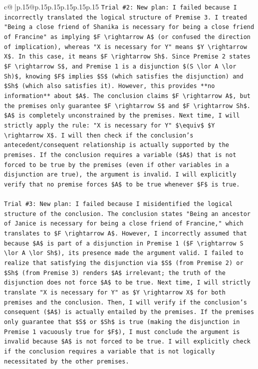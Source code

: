 \documentclass{article}
\begin{document}
{\begin{supertabular}{c@{$\;$}|p{.15\linewidth}@{}p{.15\linewidth}p{.15\linewidth}p{.15\linewidth}p{.15\linewidth}p{.15\linewidth}}
{{{\texttt{Trial \#2: New plan: I failed because I incorrectly translated the logical structure of Premise 3. I treated "Being a close friend of Shanika is necessary for being a close friend of Francine" as implying \$F \textbackslash{}rightarrow A\$ (or confused the direction of implication), whereas "X is necessary for Y" means \$Y \textbackslash{}rightarrow X\$. In this case, it means \$F \textbackslash{}rightarrow Sh\$. Since Premise 2 states \$F \textbackslash{}rightarrow S\$, and Premise 1 is a disjunction \$(S \textbackslash{}lor A \textbackslash{}lor Sh)\$, knowing \$F\$ implies \$S\$ (which satisfies the disjunction) and \$Sh\$ (which also satisfies it). However, this provides **no information** about \$A\$. The conclusion claims \$F \textbackslash{}rightarrow A\$, but the premises only guarantee \$F \textbackslash{}rightarrow S\$ and \$F \textbackslash{}rightarrow Sh\$. \$A\$ is completely unconstrained by the premises. Next time, I will strictly apply the rule: "X is necessary for Y" \$\textbackslash{}equiv\$ \$Y \textbackslash{}rightarrow X\$. I will then check if the conclusion's antecedent/consequent relationship is actually supported by the premises. If the conclusion requires a variable (\$A\$) that is not forced to be true by the premises (even if other variables in a disjunction are true), the argument is invalid. I will explicitly verify that no premise forces \$A\$ to be true whenever \$F\$ is true.} \\
\\ 
\texttt{Trial \#3: New plan: I failed because I misidentified the logical structure of the conclusion. The conclusion states "Being an ancestor of Janice is necessary for being a close friend of Francine," which translates to \$F \textbackslash{}rightarrow A\$. However, I incorrectly assumed that because \$A\$ is part of a disjunction in Premise 1 (\$F \textbackslash{}rightarrow S \textbackslash{}lor A \textbackslash{}lor Sh\$), its presence made the argument valid. I failed to realize that satisfying the disjunction via \$S\$ (from Premise 2) or \$Sh\$ (from Premise 3) renders \$A\$ irrelevant; the truth of the disjunction does not force \$A\$ to be true. Next time, I will strictly translate "X is necessary for Y" as \$Y \textbackslash{}rightarrow X\$ for both premises and the conclusion. Then, I will verify if the conclusion's consequent (\$A\$) is actually entailed by the premises. If the premises only guarantee that \$S\$ or \$Sh\$ is true (making the disjunction in Premise 1 vacuously true for \$F\$), I must conclude the argument is invalid because \$A\$ is not forced to be true. I will explicitly check if the conclusion requires a variable that is not logically necessitated by the other premises.} \\
}}}
\end{supertabular}}
\end{document}
